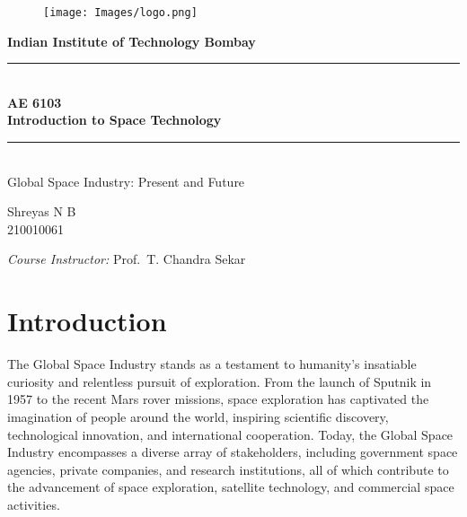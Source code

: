 \documentclass[12pt]{article}
\begin{document}
\begin{figure}
    \centering
    \texttt{[image: Images/logo.png]}
\end{figure}

\begin{center}
    \textbf{\LARGE Indian Institute of Technology Bombay} \\
    \vspace{1cm}
    \vspace{0.3cm}

    \rule{\linewidth}{0.5pt} \\
    \vspace{0.2cm}
    \textbf{\LARGE AE 6103 \\ \vspace{0.3cm} Introduction to Space Technology} \\
    \vspace{0.1cm}
    \rule{\linewidth}{0.5pt} \\
    \vspace{1.5cm}
    \LARGE Global Space Industry: Present and Future\\

    \vspace{2cm}

    \normalsize Shreyas N B \\
    210010061

    \vspace{3cm}

    \normalsize\textit{Course Instructor:}\vspace{0.2cm}
    Prof.\ T. Chandra Sekar

    \vspace{1cm}
    \date{}
\end{center}

\newpage

\tableofcontents

\newpage

\section{Introduction}
The Global Space Industry stands as a testament to humanity's insatiable curiosity and relentless pursuit of exploration. From the launch of Sputnik in 1957 to the recent Mars rover missions, space exploration has captivated the imagination of people around the world, inspiring scientific discovery, technological innovation, and international cooperation. Today, the Global Space Industry encompasses a diverse array of stakeholders, including government space agencies, private companies, and research institutions, all of which contribute to the advancement of space exploration, satellite technology, and commercial space activities.
\end{document}
